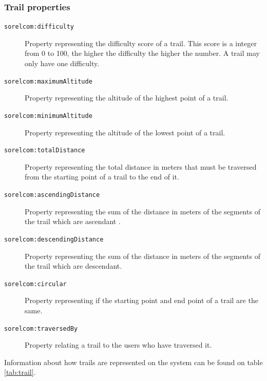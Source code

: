 \subsubsection*{Trail properties}

\begin{description}
\item[\texttt{sorelcom:difficulty}] Property representing the difficulty score of a trail. This score is a integer from 0 to 100, the higher the difficulty the higher the number. A trail may only have one difficulty.
\item[\texttt{sorelcom:maximumAltitude}] Property representing the altitude of the highest point of a trail.
\item[\texttt{sorelcom:minimumAltitude}] Property representing the altitude of the lowest point of a trail.
\item[\texttt{sorelcom:totalDistance}] Property representing the total distance in meters that must be traversed from the starting point of a trail to the end of it.
\item[\texttt{sorelcom:ascendingDistance}] Property representing the sum of the distance in meters of the segments of the trail which are ascendant .
\item[\texttt{sorelcom:descendingDistance}] Property representing the sum of the distance in meters of the segments of the trail which are descendant.
\item[\texttt{sorelcom:circular}] Property representing if the starting point and end point of a trail are the same.
\item[\texttt{sorelcom:traversedBy}] Property relating a trail to the users who have traversed it.
\end{description}

Information about how trails are represented on the system can be found on table \ref{tab:trail}.

